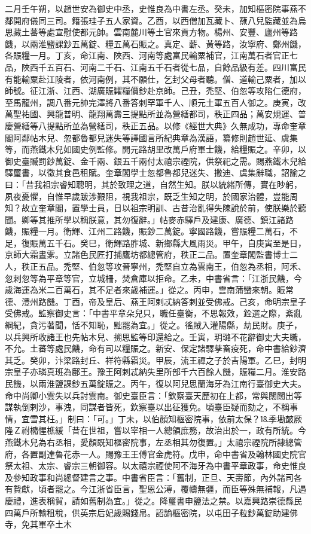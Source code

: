\begin{pinyinscope}
 二月壬午朔，以趙世安為御史中丞，史惟良為中書左丞。癸未，加知樞密院事燕不鄰開府儀同三司。籍張珪子五人家資。乙酉，以西僧加瓦藏卜、蘸八兒監藏並為烏思藏土蕃等處宣慰使都元帥。雲南麓川等土官來貢方物。楊州、安豐、廬州等路饑，以兩淮鹽課鈔五萬錠、糧五萬石賑之。真定、蘄、黃等路，汝寧府、鄭州饑，各賑糧一月。丁亥，命江南、陜西、河南等處富民輸粟補官，江南萬石者官正七品，陜西千五百石、河南二千石、江南五千石者從七品，自餘品級有差。四川富民有能輸粟赴江陵者，依河南例，其不願仕，乞封父母者聽。僧、道輸己粟者，加以師號。征江浙、江西、湖廣賑糶糧價鈔赴京師。己丑，禿堅、伯忽等攻陷仁德府，至馬龍州，調八番元帥完澤將八番答剌罕軍千人、順元土軍五百人御之。庚寅，改萬聖祐國、興龍普明、龍翔萬壽三提點所並為營繕都司，秩正四品；萬安規運、普慶營繕等八提點所並為營繕司，秩正五品。以修《經世大典》久無成功，專命奎章閣阿鄰帖木兒、忽都魯都兒迷失等譯國言所紀典章為漢語，纂修則趙世延、虞集等，而燕鐵木兒如國史例監修。開元路胡里改萬戶府軍士饑，給糧賑之。辛卯，以御史臺贓罰鈔萬錠、金千兩、銀五千兩付太禧宗禋院，供祭祀之需。賜燕鐵木兒給驛璽書，以徵其食邑租賦。奎章閣學士忽都魯都兒迷失、撒迪、虞集辭職，詔諭之曰：「昔我祖宗睿知聰明，其於致理之道，自然生知。朕以統緒所傳，實在眇躬，夙夜憂懼，自惟早歲跋涉艱阻，視我祖宗，既乏生知之明，於國家治體，豈能周知？故立奎章閣，置學士員，日以祖宗明訓、古昔治亂得失陳說於前，使朕樂於聽聞。卿等其推所學以稱朕意，其勿復辭。」帖麥赤驛戶及建康、廣德、鎮江諸路饑，賑糧一月。衛輝、江州二路饑，賑鈔二萬錠。寧國路饑，嘗賑糧二萬石，不足，復賑萬五千石。癸巳，衛輝路胙城、新鄉縣大風雨災。甲午，自庚寅至是日，京師大霜晝雺。立諸色民匠打捕鷹坊都總管府，秩正二品。置奎章閣監書博士二人，秩正五品。禿堅、伯忽等攻晉寧州，禿堅自立為雲南王，伯忽為丞相，阿禾、忽剌忽等為平章等官，立城柵，焚倉庫以拒命。乙未，中書省言：「江浙民饑，今歲海運為米二百萬石，其不足者來歲補運。」從之。丙申，雲南蒲蠻來朝。賑常德、澧州路饑。丁酉，帝及皇后、燕王阿剌忒納答剌並受佛戒。己亥，命明宗皇子受佛戒。監察御史言：「中書平章朵兒只，職任臺衡，不思報效，銓選之際，紊亂綱紀，貪污著聞，恬不知恥，黜罷為宜。」從之。徭賊入灌陽縣，劫民財。庚子，以兵興所收諸王也先帖木兒、搠思監等印還給之。壬寅，玥璐不花辭御史大夫職，不允。土蕃等處民饑，命有司以糧賑之。新安、保定諸驛孳畜疫死，命中書給鈔濟其乏。癸卯，汴梁路封丘、祥符縣霜災。甲辰，流王禪之子於吉陽軍。乙巳，封明宗皇子亦璘真班為鄜王。豫王阿剌忒納失里所部千六百餘人饑，賑糧二月。淮安路民饑，以兩淮鹽課鈔五萬錠賑之。丙午，復以阿兒思蘭海牙為江南行臺御史大夫。命中尚卿小雲失以兵討雲南。御史臺臣言：「欽察臺天歷初在上都，常與闊闊出等謀執倒剌沙，事洩，同謀者皆死，欽察臺以出征獲免。頃臺臣疑而劾之，不稱事情，宜雪其枉。」制曰：「可。」丁未，以伯顏知樞密院事，依前太保？⒙季墈皶厥隆Ｚ祔橢惺樵緩「昔在世祖，嘗以宰相一人總領庶務，故治出於一，政有所統。今燕鐵木兒為右丞相，愛顏既知樞密院事，左丞相其勿復置。」太禧宗禋院所隸總管府，各置副達魯花赤一人。賜豫王王傅官金虎符。戊申，命中書省及翰林國史院官祭太祖、太宗、睿宗三朝御容。以太禧宗禋使阿不海牙為中書平章政事，命史惟良及參知政事和尚總督建言之事。中書省臣言：「舊制，正旦、天壽節，內外諸司各有贄獻，頃者罷之。今江浙省臣言，聖恩公溥，覆幬無疆，而臣等殊無補報，凡遇慶禮，進表稱賀，請如舊制為宜。」從之。降璽書申鹽法之禁。以嘉興路崇德縣民四萬戶所輸租稅，供英宗后妃歲賜錢帛。詔諭樞密院，以屯田子粒鈔萬錠助建佛寺，免其軍卒土木
\end{pinyinscope}
